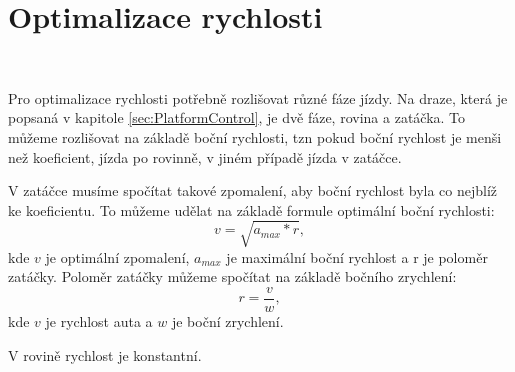 \chapter{Optimalizace rychlosti}
\label{sec:SpeedOptimization}
\vspace{-20pt}
\

Pro optimalizace rychlosti potřebně rozlišovat různé fáze jízdy.
Na draze, která je popsaná v kapitole \ref{sec:PlatformControl},
je dvě fáze, rovina a zatáčka. To můžeme rozlišovat na základě
boční rychlosti, tzn pokud boční rychlost je menši než koeficient,
jízda po rovinně, v jiném případě jízda v zatáčce.

V zatáčce musíme spočítat takové zpomalení, aby boční rychlost byla co nejblíž
ke koeficientu. To můžeme udělat na základě formule optimální boční rychlosti:
\begin{equation}
v = \sqrt{a_{max} * r},
\end{equation}
kde $v$ je optimální zpomalení, $a_{max}$ je maximální boční rychlost a r je
poloměr zatáčky. Poloměr zatáčky můžeme spočítat na základě bočního zrychlení:
\begin{equation}
r = \frac{v}{w},
\end{equation}
kde $v$ je rychlost auta a $w$ je boční zrychlení.

V rovině rychlost je konstantní.

\endinput
